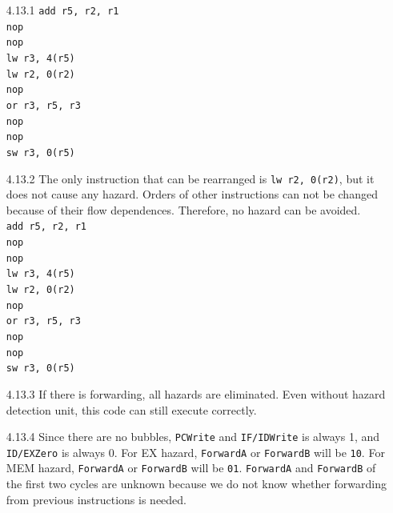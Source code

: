 \documentclass[12pt, a4paper]{article}
\begin{document}
\begin{itemize}[font=\bfseries]
\newpage
\item[4.13.1]
\texttt{add r5, r2, r1} \\
\texttt{nop} \\
\texttt{nop} \\
\texttt{lw r3, 4(r5)} \\
\texttt{lw r2, 0(r2)} \\
\texttt{nop} \\
\texttt{or r3, r5, r3} \\
\texttt{nop} \\
\texttt{nop} \\
\texttt{sw r3, 0(r5)} \\
\item[4.13.2]
The only instruction that can be rearranged is \texttt{lw r2, 0(r2)}, but it does not cause any hazard. Orders of other instructions can not be changed because of their flow dependences. Therefore, no hazard can be avoided. \\
\texttt{add r5, r2, r1} \\
\texttt{nop} \\
\texttt{nop} \\
\texttt{lw r3, 4(r5)} \\
\texttt{lw r2, 0(r2)} \\
\texttt{nop} \\
\texttt{or r3, r5, r3} \\
\texttt{nop} \\
\texttt{nop} \\
\texttt{sw r3, 0(r5)} \\
\item[4.13.3]
If there is forwarding, all hazards are eliminated. Even without hazard detection unit, this code can still execute correctly.  
\item[4.13.4]
Since there are no bubbles, \texttt{PCWrite} and \texttt{IF/IDWrite} is always 1, and \texttt{ID/EXZero} is always 0. For EX hazard, \texttt{ForwardA} or \texttt{ForwardB} will be \texttt{10}. For MEM hazard, \texttt{ForwardA} or \texttt{ForwardB} will be \texttt{01}. \texttt{ForwardA} and \texttt{ForwardB} of the first two cycles are unknown because we do not know whether forwarding from previous instructions is needed. \\
\newpage
{} \\
 \\

\end{itemize}
\end{document}
